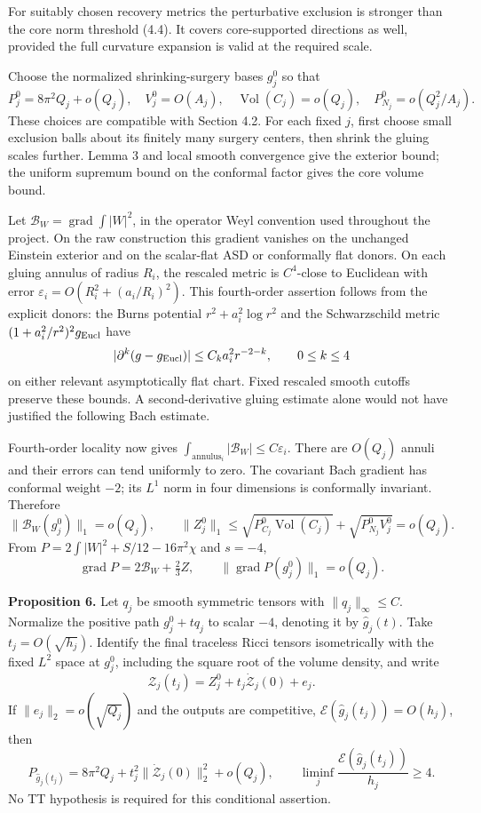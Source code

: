 \documentclass[
  10pt,
]{article}
\begin{document}
For suitably chosen recovery metrics the perturbative exclusion is
stronger than the core norm threshold (4.4). It covers core-supported
directions as well, provided the full curvature expansion is valid at
the required scale.

Choose the normalized shrinking-surgery bases \(g_j^0\) so that \[
 P_j^0=8\pi^2Q_j+o(Q_j),\quad V_j^0=O(A_j),\quad
 \operatorname{Vol}(C_j)=o(Q_j),\quad
 P_{N_j}^0=o(Q_j^2/A_j). \tag{4.11}
\] These choices are compatible with Section 4.2. For each fixed \(j\),
first choose small exclusion balls about its finitely many surgery
centers, then shrink the gluing scales further. Lemma 3 and local smooth
convergence give the exterior bound; the uniform supremum bound on the
conformal factor gives the core volume bound.

Let \(\mathcal B_W=\operatorname{grad}\int|W|^2\), in the operator Weyl
convention used throughout the project. On the raw construction this
gradient vanishes on the unchanged Einstein exterior and on the
scalar-flat ASD or conformally flat donors. On each gluing annulus of
radius \(R_i\), the rescaled metric is \(C^4\)-close to Euclidean with
error \(\varepsilon_i=O(R_i^2+(a_i/R_i)^2)\). This fourth-order
assertion follows from the explicit donors: the Burns potential
\(r^2+a_i^2\log r^2\) and the Schwarzschild metric
\((1+a_i^2/r^2)^2g_{\rm Eucl}\) have \[
 |\partial^k(g-g_{\rm Eucl})|\le C_k a_i^2r^{-2-k},
 \qquad 0\le k\le4
\] on either relevant asymptotically flat chart. Fixed rescaled smooth
cutoffs preserve these bounds. A second-derivative gluing estimate alone
would not have justified the following Bach estimate.

Fourth-order locality now gives
\(\int_{\mathrm{annulus}_i}|\mathcal B_W|\le C\varepsilon_i\). There are
\(O(Q_j)\) annuli and their errors can tend uniformly to zero. The
covariant Bach gradient has conformal weight \(-2\); its \(L^1\) norm in
four dimensions is conformally invariant. Therefore \[
 \|\mathcal B_W(g_j^0)\|_1=o(Q_j),\qquad
 \|Z_j^0\|_1
 \le\sqrt{P_{C_j}^0\operatorname{Vol}(C_j)}
       +\sqrt{P_{N_j}^0V_j^0}=o(Q_j). \tag{4.12}
\] From \(P=2\int|W|^2+S/12-16\pi^2\chi\) and \(s=-4\), \[
 \operatorname{grad}P=2\mathcal B_W+\tfrac23 Z,\qquad
 \|\operatorname{grad}P(g_j^0)\|_1=o(Q_j). \tag{4.13}
\]

\textbf{Proposition 6.} Let \(q_j\) be smooth symmetric tensors with
\(\|q_j\|_\infty\le C\). Normalize the positive path \(g_j^0+tq_j\) to
scalar \(-4\), denoting it by \(\widehat g_j(t)\). Take
\(t_j=O(\sqrt{h_j})\). Identify the final traceless Ricci tensors
isometrically with the fixed \(L^2\) space at \(g_j^0\), including the
square root of the volume density, and write \[
 \mathcal Z_j(t_j)=Z_j^0+t_j\dot{\mathcal Z}_j(0)+e_j. \tag{4.14}
\] If \(\|e_j\|_2=o(\sqrt{Q_j})\) and the outputs are competitive,
\(\mathcal E(\widehat g_j(t_j))=O(h_j)\), then \[
 P_{\widehat g_j(t_j)}
     =8\pi^2Q_j+t_j^2\|\dot{\mathcal Z}_j(0)\|_2^2+o(Q_j),
 \qquad \liminf_j\frac{\mathcal E(\widehat g_j(t_j))}{h_j}\ge4.
 \tag{4.15}
\] No TT hypothesis is required for this conditional assertion.
\end{document}
